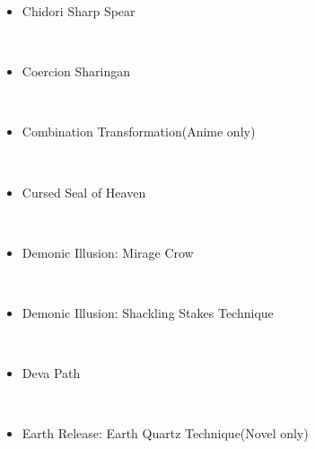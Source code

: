 \documentclass[a4paper,12pt]{article}
\begin{document}
\begin{itemize}
\item Chidori Sharp Spear
\end{itemize}\\ \par \vspace{0.5cm}

\begin{itemize}
\item Coercion Sharingan
\end{itemize}\\ \par \vspace{0.5cm}

\begin{itemize}
\item Combination Transformation(Anime only)
\end{itemize}\\ \par \vspace{0.5cm}

\begin{itemize}
\item Cursed Seal of Heaven
\end{itemize}\\ \par \vspace{0.5cm}

\begin{itemize}
\item Demonic Illusion: Mirage Crow
\end{itemize}\\ \par \vspace{0.5cm}

\begin{itemize}
\item Demonic Illusion: Shackling Stakes Technique
\end{itemize}\\ \par \vspace{0.5cm}

\begin{itemize}
\item Deva Path
\end{itemize}\\ \par \vspace{0.5cm}

\begin{itemize}
\item Earth Release: Earth Quartz Technique(Novel only)
\end{itemize}\\ \par \vspace{0.5cm}
\end{document}
